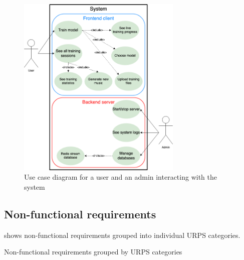 \documentclass[a4paper, 11pt, twoside]{report}
\theoremstyle{definition}
\begin{document}
\begin{figure}[t]
    \centering
    \includegraphics[width=0.7\textwidth]{use_case_diagram.png}
    \caption{Use case diagram for a user and an admin interacting with the system}
    \label{fig:use_case_diagram}
\end{figure} \par

\subsection{Non-functional requirements}

 shows non-functional requirements grouped into individual URPS categories. \par

\begin{table}[H]
    \caption{Non-functional requirements grouped by URPS categories}
    \label{tab:URPS}
\end{table}
\addtocounter{table}{-1}
\end{document}
